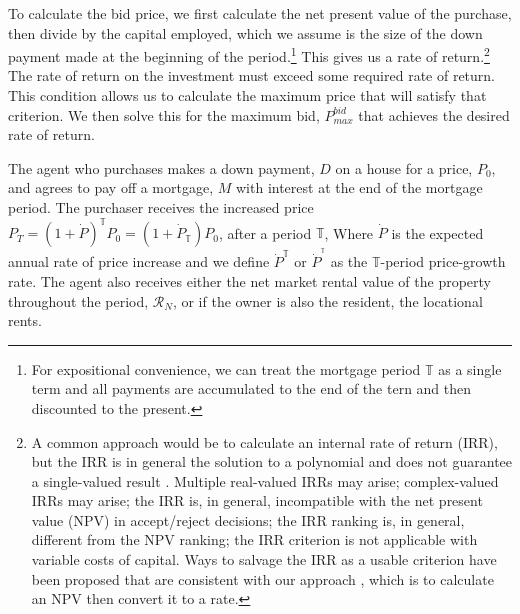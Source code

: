 {To calculate the bid price, we first calculate the net present value of the purchase, then divide by the capital employed, which we assume is the size of the down payment made at the beginning of the period.\footnote{For expositional convenience, we can treat the mortgage period $\mathbb{T}$ as a single term and all payments are accumulated to the end of the tern and then discounted to the present.} 
This gives us a rate of return.\footnote{A common approach would be to calculate an internal rate of return (IRR), but  the IRR is in general the solution to a polynomial and does not guarantee a single-valued result \cite{robinsonOptimalTerminationIRR1996}. Multiple real-valued  IRRs may arise;  complex-valued IRRs may arise;  the IRR is, in general, incompatible with the net present value (NPV) in accept/reject decisions; the IRR ranking is, in general, different from the NPV ranking; the IRR criterion is not applicable with variable costs of capital. Ways to salvage the IRR as a usable criterion have been proposed that are consistent with our approach \cite{magniAverageInternalRate2010}, which is to calculate an NPV then convert it to a rate.} 
The rate of return on the investment must exceed some required rate of return. This condition allows us to calculate the maximum price that will satisfy that criterion.
We then solve this for  the maximum bid, $P_{max}^{bid}$ that achieves the desired rate of return. 

The agent who purchases makes a down payment, $D$ on a house for a price, $P_0$, and agrees to pay off a mortgage, $M$ with interest at the end of the mortgage period.  The purchaser  receives the increased price 
$P_T = (1 + \dot P)^\mathbb{T}P_0 =(1+\dot P_\mathbb{T})P_0 $, 
after a period $\mathbb{T}$, Where $\dot P$  is the expected annual rate of price increase and we define $\dot P^\mathbb{T}$
or $\dot P^{^\mathbb{T}}$ 
as the $\mathbb{T}$-period  price-growth rate. The agent also receives either the net market rental value of the property throughout the period, $\mathcal{R}_N$, or if the owner is also the resident, the locational rents. 
 

}
